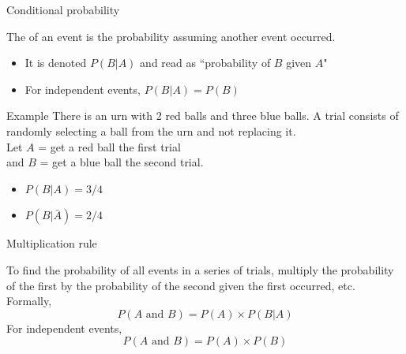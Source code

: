 \documentclass[xcolor=table]{beamer}
\begin{document}
\begin{frame}{Conditional probability}
\begin{block}{}
\large The  of an event is the probability assuming another event occurred. 
\begin{itemize}
\pause
\item It is denoted $P(B|A)$ and read as ``probability of $B$ given $A$"
\pause
\item For independent events, $P(B|A) = P(B)$
\end{itemize}
\end{block}

\pause

\begin{exampleblock}{Example}
There is an urn with 2 red balls and three blue balls. A trial consists of randomly selecting a ball from the urn and not replacing it.\\
Let $A$ = get a red ball the first trial\\
 and $B$ = get a blue ball the second trial.
\begin{itemize}
\pause
\item $P(B | A) = 3 / 4$
\pause
\item $P(B | \bar A) =  2 / 4$
\end{itemize}

\end{exampleblock}
\end{frame}

\begin{frame}{Multiplication rule}
\begin{block}{}
To find the probability of all events in a series of trials, multiply the probability of the first by the probability of the second given the first occurred, etc.\\
\medskip
\pause
Formally,
\[P(A \text{ and } B) = P(A) \times P(B|A)\]
\pause
For independent events,
\[P(A \text{ and } B) = P(A) \times P(B)\]
\end{block}
\end{frame}
\end{document}
